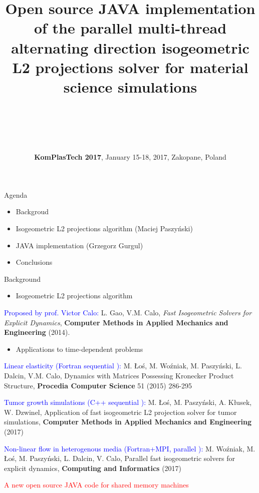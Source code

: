 \documentclass[c]{beamer}
\title{%
Open source JAVA implementation of the parallel multi-thread alternating direction
isogeometric L2 projections solver for material science simulations}
\author{%
    \inblue{\bf Grzegorz Gurgul (AGH)} \\
    \inblue{Maciej Wo\'{z}niak (AGH)} \\
    \inblue{Marcin \L{}o\'{s} (AGH)} \\
    \inblue{Danuta~Szeliga (AGH)} \\
      \inblue{\bf Maciej Paszy\'{n}ski (AGH)} }
\date{{\bf KomPlasTech 2017}, January 15-18, 2017, Zakopane, Poland}
\newcommand{\inred}[1]{\textcolor{red}{#1}}
\newcommand{\inblue}[1]{\textcolor{blue}{#1}}
\begin{document}

\begin{frame}
  \titlepage
\end{frame}

\begin{frame}{Agenda}

\begin{itemize}
  \item Backgroud
  \item Isogeometric L2 projections algorithm (Maciej Paszy\'{n}ski)
  \item JAVA implementation (Grzegorz Gurgul)
  \item Conclusions
\end{itemize}

\end{frame}


\begin{frame}{Background}

{\small
\begin{itemize}
  \item Isogeometric L2 projections algorithm
\end{itemize}
  \inblue{Proposed by prof. Victor Calo:} 
L. Gao, V.M. Calo, \emph{Fast Isogeometric Solvers for Explicit Dynamics}, {\bf Computer Methods in Applied Mechanics and Engineering} (2014). 
\begin{itemize}
  \item Applications to time-dependent problems
\end{itemize}
\inblue{Linear elasticity (Fortran sequential ): }M. \L{}o\'{s}, M. Wo\'{z}niak, M. Paszy\'{n}ski, L. Dalcin, V.M. Calo, Dynamics with Matrices Possessing Kronecker Product Structure, {\bf Procedia Computer Science} 51 (2015) 286-295

\inblue{Tumor growth simulations (C++ sequential ): }M. \L{}o\'{s}, M. Paszy\'{n}ski, A. K\l{}usek, W. Dzwinel, Application of fast isogeometric L2 projection solver for tumor simulations, {\bf Computer Methods in Applied Mechanics and Engineering} (2017) 
}

\inblue{Non-linear flow in heterogenous media (Fortran+MPI, parallel ): }
M. Wo\'{z}niak, M. \L{}o\'{s}, M. Paszy\'{n}ski, L. Dalcin, V. Calo, 
Parallel fast isogeometric solvers for explicit dynamics, {\bf Computing and Informatics} (2017) 

\inred{A new open source JAVA code for shared memory machines}
\end{frame}
\end{document}
